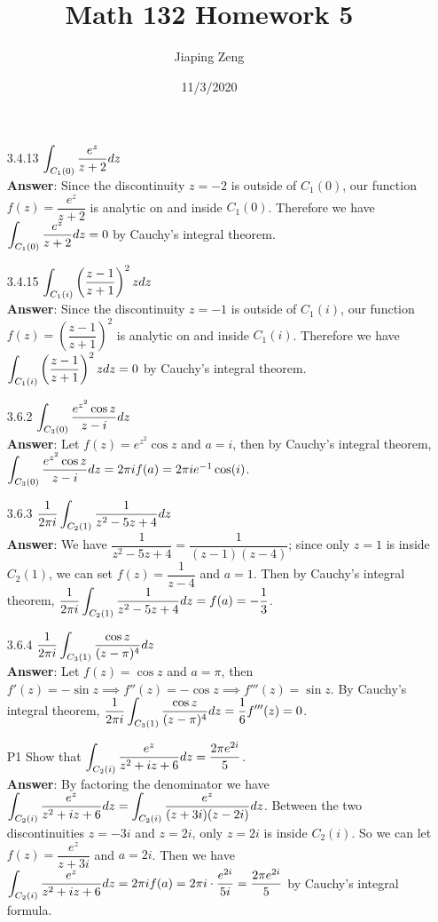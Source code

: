 \documentclass{article}
\title{Math 132 Homework 5}
\date{11/3/2020}
\author{Jiaping Zeng}
\begin{document}
\maketitle

\begin{itemize}
    \item [3.4.13] $\mathlarger{\int_{C_1(0)}\dfrac{e^z}{z+2}dz}$\\
          \textbf{Answer}: Since the discontinuity $z=-2$ is outside of $C_1(0)$, our function $f(z)=\dfrac{e^z}{z+2}$ is analytic on and inside $C_1(0)$. Therefore we have $\mathlarger{\int_{C_1(0)}\frac{e^z}{z+2}dz}=0$ by Cauchy's integral theorem.
    \item [3.4.15] $\mathlarger{\int_{C_1(i)}\left(\frac{z-1}{z+1}\right)^2zdz}$\\
          \textbf{Answer}: Since the discontinuity $z=-1$ is outside of $C_1(i)$, our function $f(z)=\left(\dfrac{z-1}{z+1}\right)^2$ is analytic on and inside $C_1(i)$. Therefore we have $\mathlarger{\int_{C_1(i)}\left(\frac{z-1}{z+1}\right)^2zdz}=0$ by Cauchy's integral theorem.
    \item [3.6.2] $\mathlarger{\int_{C_3(0)}\frac{e^{z^2}\cos z}{z-i}dz}$\\
          \textbf{Answer}: Let $f(z)=e^{z^2}\cos z$ and $a=i$, then by Cauchy's integral theorem, $\mathlarger{\int_{C_3(0)}\frac{e^{z^2}\cos z}{z-i}dz}=2\pi if(a)=2\pi ie^{-1}\cos(i)$.
    \item [3.6.3] $\mathlarger{\frac{1}{2\pi i}\int_{C_2(1)}\frac{1}{z^2-5z+4}dz}$\\
    \textbf{Answer}: We have $\dfrac{1}{z^2-5z+4}=\dfrac{1}{(z-1)(z-4)}$; since only $z=1$ is inside $C_2(1)$, we can set $f(z)=\dfrac{1}{z-4}$ and $a=1$. Then by Cauchy's integral theorem, $\mathlarger{\frac{1}{2\pi i}\int_{C_2(1)}\frac{1}{z^2-5z+4}dz=f(a)=-\dfrac{1}{3}}$.
    \item [3.6.4] $\mathlarger{\frac{1}{2\pi i}\int_{C_3(1)}\frac{\cos z}{(z-\pi)^4}dz}$\\
    \textbf{Answer}: Let $f(z)=\cos z$ and $a=\pi$, then $f'(z)=-\sin z\implies f''(z)=-\cos z\implies f'''(z)=\sin z$. By Cauchy's integral theorem, $\mathlarger{\frac{1}{2\pi i}\int_{C_3(1)}\frac{\cos z}{(z-\pi)^4}dz=\frac{1}{6}f'''(z)=0}$.
    \item [P1] Show that $\mathlarger{\int_{C_2(i)}\frac{e^z}{z^2+iz+6}dz=\frac{2\pi e^{2i}}{5}}$.\\
          \textbf{Answer}: By factoring the denominator we have $\mathlarger{\int_{C_2(i)}\frac{e^z}{z^2+iz+6}dz=\int_{C_2(i)}\frac{e^z}{(z+3i)(z-2i)}dz}$. Between the two discontinuities $z=-3i$ and $z=2i$, only $z=2i$ is inside $C_2(i)$. So we can let $f(z)=\dfrac{e^z}{z+3i}$ and $a=2i$. Then we have $\mathlarger{\int_{C_2(i)}\frac{e^z}{z^2+iz+6}dz=2\pi if(a)=2\pi i\cdot\frac{e^{2i}}{5i}=\frac{2\pi e^{2i}}{5}}$ by Cauchy's integral formula.

\end{itemize}
\end{document}
